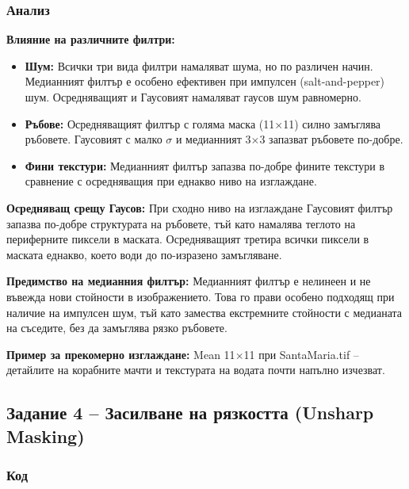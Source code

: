 \subsubsection{Анализ}

\textbf{Влияние на различните филтри:}
\begin{itemize}
    \item \textbf{Шум:} Всички три вида филтри намаляват шума, но по различен начин. Медианният филтър е особено ефективен при импулсен (salt-and-pepper) шум. Осредняващият и Гаусовият намаляват гаусов шум равномерно.
    \item \textbf{Ръбове:} Осредняващият филтър с голяма маска (11$\times$11) силно замъглява ръбовете. Гаусовият с малко $\sigma$ и медианният 3$\times$3 запазват ръбовете по-добре.
    \item \textbf{Фини текстури:} Медианният филтър запазва по-добре фините текстури в сравнение с осредняващия при еднакво ниво на изглаждане.
\end{itemize}

\textbf{Осредняващ срещу Гаусов:} При сходно ниво на изглаждане Гаусовият филтър запазва по-добре структурата на ръбовете, тъй като намалява теглото на периферните пиксели в маската. Осредняващият третира всички пиксели в маската еднакво, което води до по-изразено замъгляване.

\textbf{Предимство на медианния филтър:} Медианният филтър е нелинеен и не въвежда нови стойности в изображението. Това го прави особено подходящ при наличие на импулсен шум, тъй като замества екстремните стойности с медианата на съседите, без да замъглява рязко ръбовете.

\textbf{Пример за прекомерно изглаждане:} Mean 11$\times$11 при SantaMaria.tif – детайлите на корабните мачти и текстурата на водата почти напълно изчезват.

\subsection{Задание 4 – Засилване на рязкостта (Unsharp Masking)}

\subsubsection{Код}

